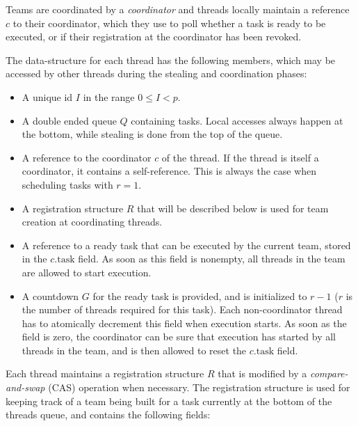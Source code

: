 \documentclass[preprint]{sigplanconf}
\begin{document}
Teams are coordinated by a \emph{coordinator} and threads locally
maintain a reference $c$ to their coordinator, which they use to poll
whether a task is ready to be executed, or if their registration at
the coordinator has been revoked.

The data-structure for each thread has the following members, which
may be accessed by other threads during the stealing and coordination
phases:
\begin{itemize}
\item
A unique id $I$ in the range $0 \leq I < p$.
\item
A double ended queue $Q$ containing
tasks. Local accesses always happen at the bottom, while stealing is
done from the top of the queue.
\item
A reference to the coordinator $c$ of the thread. If the thread is 
itself a coordinator, it contains a self-reference. This is always the
case when scheduling tasks with $r=1$.
\item
A registration structure $R$ that will be described below
is used for team creation at coordinating threads.
\item
A reference to a ready task that can be executed
by the current team, stored in the $c.\mbox{task}$ field. As soon as this
field is nonempty, all threads in the team are allowed to start
execution.
\item
A countdown $G$ for the ready task is provided, and is initialized to
$r-1$ ($r$ is the number of threads required for this task). Each
non-coordinator thread has to atomically decrement this field when
execution starts. As soon as the field is zero, the coordinator can be
sure that execution has started by all threads in the team, and is
then allowed to reset the $c.\mbox{task}$ field.
\end{itemize}

Each thread maintains a registration structure $R$ that is modified by a
\emph{compare-and-swap} (CAS) operation when necessary. The registration
structure is used for keeping track of a team being built for a task
currently at the bottom of the threads queue, and contains the following 
fields:
\end{document}

